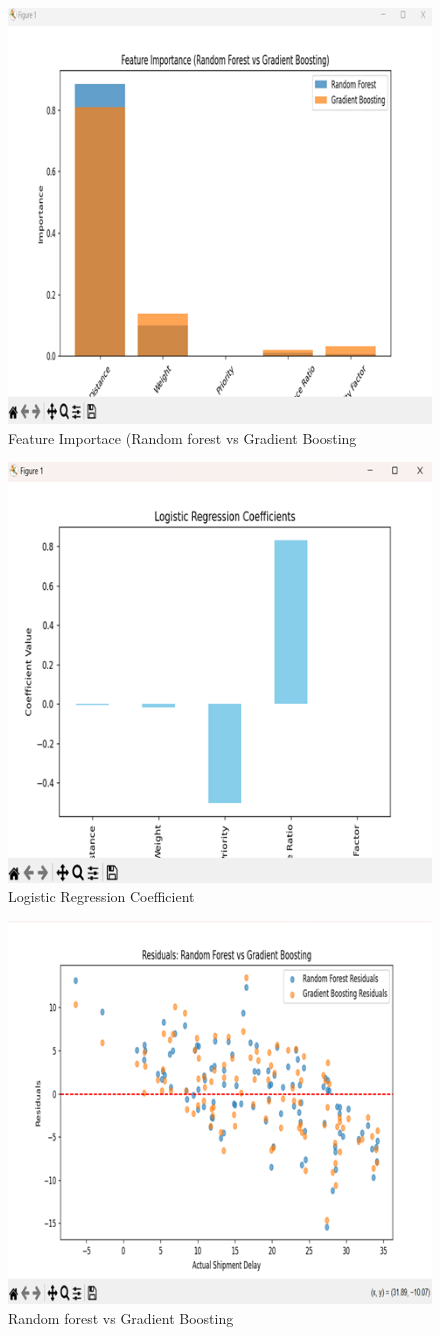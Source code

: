 \documentclass[conference]{IEEEtran}
\begin{document}
\begin{figure}
    \centering
    \includegraphics[width=0.5\linewidth]{image4.png}
    \caption{Feature Importace (Random forest vs Gradient Boosting}
    \label{fig:enter-label}
\end{figure}
\begin{figure}
    \centering
    \includegraphics[width=0.5\linewidth]{image5.png}
    \caption{Logistic Regression Coefficient}
    \label{fig:enter-label}
\end{figure}
\begin{figure}
    \centering
    \includegraphics[width=0.5\linewidth]{image6.png}
    \caption{Random forest vs Gradient Boosting}
    \label{fig:enter-label}
\end{figure}
\end{document}
